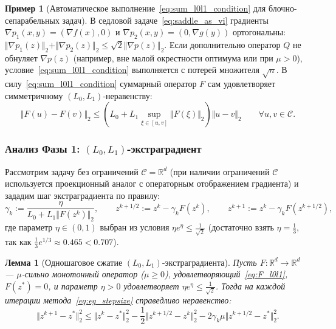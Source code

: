 \documentclass[11pt, a4paper]{article}
\newtheorem{lemma}{Лемма}[section]
\theoremstyle{definition}
\newtheorem{example}{Пример}[section]
\begin{document}
\begin{example}[Автоматическое выполнение~\eqref{eq:sum_l0l1_condition} для блочно-сепарабельных задач]
В седловой задаче~\eqref{eq:saddle_as_vi} градиенты $\nabla p_1(x, y) = (\nabla f(x), 0)$ и $\nabla p_2(x, y) = (0, \nabla g(y))$ ортогональны: $\Vert \nabla p_1(z) \Vert_2 + \Vert \nabla p_2(z) \Vert_2 \le \sqrt{2}\Vert \nabla p(z) \Vert_2$. Если дополнительно оператор $Q$ не обнуляет $\nabla p(z)$ (например, вне малой окрестности оптимума или при $\mu > 0$), условие~\eqref{eq:sum_l0l1_condition} выполняется с потерей множителя $\sqrt{n}$. В силу~\eqref{eq:sum_l0l1_condition} суммарный оператор $F$ сам удовлетворяет симметричному $(L_0, L_1)$-неравенству:
\begin{equation}\label{eq:F_l0l1}
\Vert F(u) - F(v) \Vert_2 \le \left(L_0 + L_1 \sup_{\xi \in [u, v]} \Vert F(\xi) \Vert_2\right) \Vert u - v \Vert_2 \qquad \forall u, v \in \mathcal{C}.
\end{equation}
\end{example}

\subsubsection{Анализ Фазы 1: $(L_0, L_1)$-экстраградиент}

Рассмотрим задачу без ограничений $\mathcal{C} = \mathbb{R}^d$ (при наличии ограничений $\mathcal{C}$ используется проекционный аналог с операторным отображением градиента) и зададим шаг экстраградиента по правилу:
\begin{equation}\label{eq:eg_stepsize}
\gamma_k := \frac{\eta}{L_0 + L_1 \Vert F(z^k) \Vert_2}, \qquad z^{k+1/2} := z^k - \gamma_k F(z^k), \qquad z^{k+1} := z^k - \gamma_k F(z^{k+1/2}),
\end{equation}
где параметр $\eta \in (0, 1)$ выбран из условия $\eta e^\eta \le \frac{1}{\sqrt{2}}$ (достаточно взять $\eta = \frac{1}{3}$, так как $\frac{1}{3} e^{1/3} \approx 0.465 < 0.707$).

\begin{lemma}[Одношаговое сжатие $(L_0, L_1)$-экстраградиента]\label{lem:eg_one_step}
Пусть $F : \mathbb{R}^d \to \mathbb{R}^d$ --- $\mu$-сильно монотонный оператор ($\mu \ge 0$), удовлетворяющий~\eqref{eq:F_l0l1}, $F(z^*) = 0$, и параметр $\eta > 0$ удовлетворяет $\eta e^\eta \le \frac{1}{\sqrt{2}}$. Тогда на каждой итерации метода~\eqref{eq:eg_stepsize} справедливо неравенство:
\begin{equation}\label{eq:eg_descent}
\Vert z^{k+1} - z^* \Vert_2^2 \le \Vert z^k - z^* \Vert_2^2 - \frac{1}{2} \Vert z^{k+1/2} - z^k \Vert_2^2 - 2 \gamma_k \mu \Vert z^{k+1/2} - z^* \Vert_2^2.
\end{equation}
\end{lemma}
\end{document}
